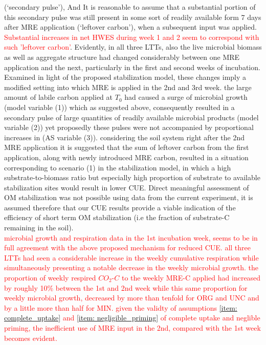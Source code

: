 \documentclass[12pt]{report}
\newcommand{\myRed}[1]{\textcolor{red}{#1}} %
\begin{document}
(‘secondary pulse’),
And It is reasonable to assume that a substantial portion of this secondary pulse was still present in some sort of readily available form 7 days after MRE application (‘leftover carbon’), when a subsequent input was applied. \myRed{Substantial increases in net HWES during week 1 and 2 seem to correspond with such 'leftover carbon'}. Evidently, in all three LTTs, also the live microbial biomass as well as  aggregate structure had changed considerably between one MRE application and the next, particularly in the first and second weeks of incubation.\\
Examined in light of the proposed stabilization model, these changes imply a modified setting into which MRE is applied in the 2nd and 3rd week. the large amount of labile carbon applied at $ T_0 $ had caused a surge of microbial growth (model variable (1)) which as suggested above, consequently resulted in a secondary pulse of large quantities of readily available microbial products (model variable (2)) yet proposedly these pulses were not accompanied by proportional increases in (AS variable (3)). considering the soil system right after the 2nd MRE application it is suggested that the sum of leftover carbon from the first application, along with newly introduced MRE carbon, resulted in a situation corresponding to scenario (1) in the stabilization model,  in which a high substrate-to-biomass ratio but especially high proportion of substrate to available stabilization sites would result in lower CUE. 
Direct meaningful  assessment of OM stabilization was not possible using data from the current experiment,
it is assumed therefore that our CUE results provide a viable indication of the efficiency of short term OM stabilization (i.e the fraction of substrate-C remaining in the soil).\\
\myRed{microbial growth and respiration data in the 1st incubation week, seems to be in full agreement with the above proposed mechanism for reduced CUE. all three LTTs had seen a considerable increase in the weekly cumulative respiration while simultaneously presenting a notable decrease in the weekly microbial growth. the proportion of weekly respired $ CO_2 $-$ C $ to the weekly MRE-C applied had increased by roughly 10\% between the 1st and 2nd week while this same proportion for weekly microbial growth, decreased by more than tenfold for ORG and UNC and by a little more than half for MIN. given the validty of assumptions \ref{item: complete_uptake} and \ref{item: negligible_priming} of complete uptake and neglible priming, the inefficient use of MRE input in the 2nd, compared with the 1st week becomes evident.} \\
\end{document}
